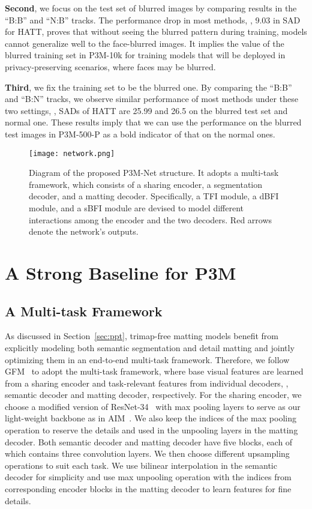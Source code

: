 \documentclass[sigconf]{acmart}
\begin{document}
\textbf{Second}, we focus on the test set of blurred images by comparing results in the ``B:B'' and ``N:B'' tracks. The performance drop in most methods, , 9.03 in SAD for HATT, proves that without seeing the blurred pattern during training, models cannot generalize well to the face-blurred images. It implies the value of the blurred training set in P3M-10k for training models that will be deployed in privacy-preserving scenarios, where faces may be blurred.

\textbf{Third}, we fix the training set to be the blurred one. By comparing the ``B:B'' and ``B:N'' tracks, we observe similar performance of most methods under these two settings, , SADs of HATT are 25.99 and 26.5 on the blurred test set and normal one.
These results imply that we can use the performance on the blurred test images in P3M-500-P as a bold indicator of that on the normal ones.

\label{sec:ppt}



\begin{figure*}[t]
    \centering
    \texttt{[image: network.png]}
    \caption{Diagram of the proposed P3M-Net structure. It adopts a multi-task framework, which consists of a sharing encoder, a segmentation decoder, and a matting decoder. Specifically, a TFI module, a dBFI module, and a sBFI module are devised to model different interactions among the encoder and the two decoders. Red arrows denote the network's outputs.}
    \label{fig:network}
\end{figure*}
\section{A Strong Baseline for P3M}



\subsection{A Multi-task Framework}
As discussed in Section~\ref{sec:ppt}, trimap-free matting models benefit from explicitly modeling both semantic segmentation and detail matting and jointly optimizing them in an end-to-end multi-task framework. Therefore, we follow GFM~\cite{gfm} to adopt the multi-task framework, where base visual features are learned from a sharing encoder and task-relevant features from individual decoders, , semantic decoder and matting decoder, respectively. For the sharing encoder, we choose a modified version of ResNet-34~\cite{he2016deep} with max pooling layers to serve as our light-weight backbone as in AIM~\cite{aim}. We also keep the indices of the max pooling operation to reserve the details and used in the unpooling layers in the matting decoder. Both semantic decoder and matting decoder have five blocks, each of which contains three convolution layers. We then choose different upsampling operations to suit each task. We use bilinear interpolation in the semantic decoder for simplicity and use max unpooling operation with the indices from corresponding encoder blocks in the matting decoder to learn features for fine details.
\end{document}
